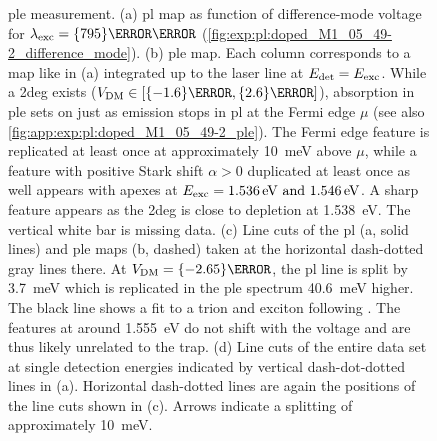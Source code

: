 \begin{figure}
    \caption[
        \protect\newline
    ]{
        \Acrlong{ple} measurement.
        (a) \gls{pl} map as function of difference-mode voltage for $\lambda_{\mr{exc}} = \qty{795}{\nano\meter}$ (\cf \cref{fig:exp:pl:doped_M1_05_49-2_difference_mode}).
        (b) \gls{ple} map.
        Each column corresponds to a map like in (a) integrated up to the laser line at $E_{\mathrm{det}} = E_{\mathrm{exc}}$.
        While a \gls{2deg} exists ($\VDM\in[\qty{-1.6}{\volt}, \qty{2.6}{\volt}]$), absorption in \gls{ple} sets on just as emission stops in \gls{pl} at the Fermi edge $\mu$ (see also \cref{fig:app:exp:pl:doped_M1_05_49-2_ple}).
        The Fermi edge feature is replicated at least once at approximately \qty{10}{\milli\electronvolt} above $\mu$, while a feature with positive Stark shift $\alpha>0$ duplicated at least once as well appears with apexes at $E_{\mr{exc}} = \qtylist{1.536;1.546}{\electronvolt}$.
        A sharp feature appears as the \gls{2deg} is close to depletion at \qty{1.538}{\electronvolt}.
        The vertical white bar is missing data.
        (c) Line cuts of the \gls{pl} (a, solid lines) and \gls{ple} maps (b, dashed) taken at the horizontal dash-dotted gray lines there.
        At $\VDM = \qty{-2.65}{\volt}$, the \gls{pl} line is split by \qty{3.7}{\milli\electronvolt} which is replicated in the \gls{ple} spectrum \qty{40.6}{\milli\electronvolt} higher.
        The black line shows a fit to a trion and exciton following .
        The features at around \qty{1.555}{\electronvolt} do not shift with the voltage and are thus likely unrelated to the trap.
        (d) Line cuts of the entire data set at single detection energies indicated by vertical dash-dot-dotted lines in (a).
        Horizontal dash-dotted lines are again the positions of the line cuts shown in (c).
        Arrows indicate a splitting of approximately \qty{10}{\milli\electronvolt}.
    }
    \label{fig:exp:pl:doped_M1_05_49-2_ple}
\end{figure}

